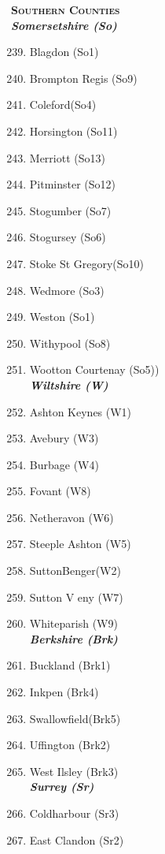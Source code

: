 \begin{refsection}
	\textbf{\textsc{Southern Counties}} \\
	\emph{\textbf{Somersetshire (So)}}
	\begin{multicols}{2}
	\begin{enumerate}\setcounter{enumi}{238}
		\item Blagdon (So1)
		\item Brompton Regis (So9)
		\item Coleford(So4)
		\item Horsington (So11)
		\item Merriott (So13)
		\item Pitminster (So12)
		\item Stogumber (So7)
		\item Stogursey (So6)
		\item Stoke St Gregory(So10)
		\item Wedmore (So3)
	    \item Weston (So1)
	    \item Withypool (So8)	
	    \item Wootton Courtenay (So5))\\
	    \emph{\textbf{Wiltshire (W)}}	
	    \item Ashton Keynes (W1)
	    \item Avebury (W3)	
	    \item Burbage (W4)
	    \item Fovant (W8)
	    \item Netheravon (W6)	
	    \item Steeple Ashton (W5)	
	    \item SuttonBenger(W2)	
	    \item Sutton V eny (W7)	
	    \item Whiteparish (W9)\\
	    \emph{\textbf{Berkshire (Brk)}}		
	    \item Buckland (Brk1)	
	    \item Inkpen (Brk4)	
	    \item Swallowfield(Brk5)	
	    \item Uffington (Brk2)
	    \item West Ilsley (Brk3)\\
	    \emph{\textbf{Surrey (Sr)}}			
	    \item Coldharbour (Sr3)	
	    \item East Clandon (Sr2)	

\end{enumerate}
\end{multicols}
\end{refsection}
